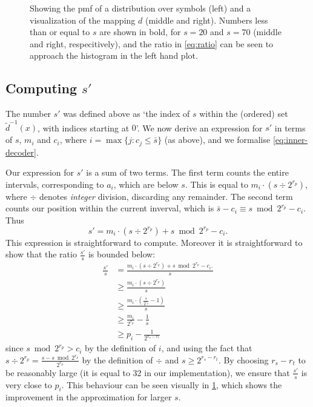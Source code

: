 \documentclass{article}
\begin{document}
\begin{figure}[h]
  \centering
  \drawpmf \quad {} \quad {}
  \caption{
    Showing the pmf of a distribution over symbols (left) and a visualization
    of the mapping $d$ (middle and right).  Numbers less than or equal to $s$
    are shown in bold, for $s=20$ and $s=70$ (middle and right, respecitively),
    and the ratio in \cref{eq:ratio} can be seen to approach the histogram in
    the left hand plot.}\label{fig:visual-ans}
\end{figure}

\subsection*{Computing $s'$}
The number $s'$ was defined above as `the index of $s$ within the (ordered) set
$\tilde d^{-1}(x)$, with indices starting at $0$'. We now derive an expression
for $s'$ in terms of $s$, $m_i$ and $c_i$, where $i = \max\{j: c_j\leq \bar
s\}$ (as above), and we formalise \cref{eq:inner-decoder}.

Our expression for $s'$ is a sum of two terms. The first term counts the entire
intervals, corresponding to $a_i$, which are below $s$. This is equal to $m_i
\cdot (s \div 2^{r_p})$, where $\div$ denotes \emph{integer} division,
discarding any remainder. The second term counts our position within the
current inverval, which is $\bar s - c_i \equiv s\bmod 2^{r_p} - c_i$. Thus
\begin{equation}
  s' = m_i \cdot (s \div 2^{r_p}) + s\bmod 2^{r_p} - c_i.
\end{equation}
This expression is straightforward to compute. Moreover it is straightforward
to show that the ratio $\frac{s'}{s}$ is bounded below:
\begin{align}
  \frac{s'}{s}
    &=    \frac{m_i\cdot(s \div 2^{r_p}) + s\bmod 2^{r_p} - c_i.}{s}\\
    &\geq \frac{m_i\cdot(s \div 2^{r_p})}{s}\\
    &\geq \frac{m_i\cdot\left(\frac{s}{2^{r_p}} - 1\right)}{s}\\
    &\geq \frac{m_i}{2^{r_p}} - \frac{1}{s}\\
    &\geq p_i - \frac{1}{2^{r_s - r_t}}
\end{align}
since $s\bmod 2^{r_p} > c_i$ by the definition of $i$, and using the fact that
$s\div 2^{r_p} = \frac{s - s\bmod 2^{r_p}}{2^{r_p}}$ by the definition of
$\div$ and $s\geq 2^{r_s - r_t}$. By choosing $r_s - r_t$ to be reasonably
large (it is equal to 32 in our implementation), we ensure that $\frac{s'}{s}$
is very close to $p_i$. This behaviour can be seen visually in
\cref{fig:visual-ans}, which shows the improvement in the approximation for
larger $s$.
\end{document}
